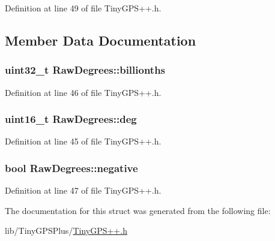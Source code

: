 Definition at line 49 of file Tiny\+G\+P\+S++.\+h.



\subsection{Member Data Documentation}
\subsubsection[{\texorpdfstring{billionths}{billionths}}]{\setlength{\rightskip}{0pt plus 5cm}uint32\+\_\+t Raw\+Degrees\+::billionths}\hypertarget{struct_raw_degrees_a13564009c60e20dbf03b158114d1c0e2}{}\label{struct_raw_degrees_a13564009c60e20dbf03b158114d1c0e2}


Definition at line 46 of file Tiny\+G\+P\+S++.\+h.

\subsubsection[{\texorpdfstring{deg}{deg}}]{\setlength{\rightskip}{0pt plus 5cm}uint16\+\_\+t Raw\+Degrees\+::deg}\hypertarget{struct_raw_degrees_a11831d9220f303bd716d9412af28e84e}{}\label{struct_raw_degrees_a11831d9220f303bd716d9412af28e84e}


Definition at line 45 of file Tiny\+G\+P\+S++.\+h.

\subsubsection[{\texorpdfstring{negative}{negative}}]{\setlength{\rightskip}{0pt plus 5cm}bool Raw\+Degrees\+::negative}\hypertarget{struct_raw_degrees_a39c31d2d0332155a4d2c975cec0a796f}{}\label{struct_raw_degrees_a39c31d2d0332155a4d2c975cec0a796f}


Definition at line 47 of file Tiny\+G\+P\+S++.\+h.



The documentation for this struct was generated from the following file\+:\begin{DoxyCompactItemize}
\item 
lib/\+Tiny\+G\+P\+S\+Plus/\hyperlink{_tiny_g_p_s_09_09_8h}{Tiny\+G\+P\+S++.\+h}\end{DoxyCompactItemize}
